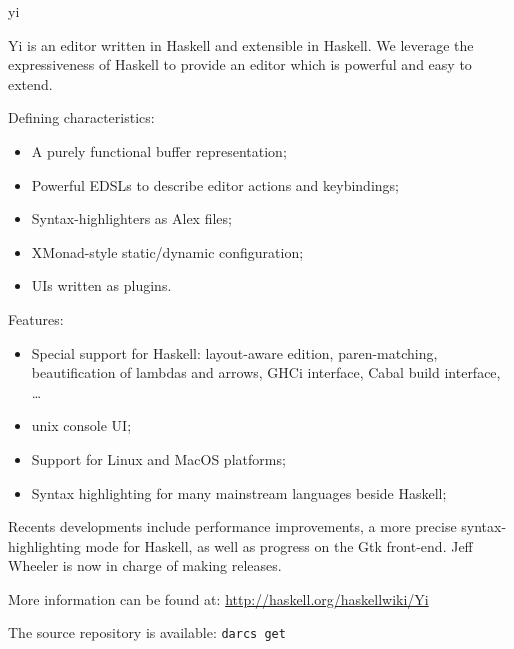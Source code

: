 \begin{hcarentry}[updated]{yi}
\label{yi}
\makeheader

Yi is an editor written in Haskell and extensible in Haskell. We leverage the
expressiveness of Haskell to provide an editor which is powerful and easy to
extend.

Defining characteristics:
\begin{itemize}
\item A purely functional buffer representation;
\item Powerful EDSLs to describe editor actions and keybindings;
\item Syntax-highlighters as Alex files;
\item XMonad-style static/dynamic configuration;
\item UIs written as plugins.
\end{itemize}

Features:
\begin{itemize}
\item Special support for Haskell: layout-aware edition, paren-matching, beautification of lambdas and arrows, GHCi interface, Cabal build interface, \dots
\item unix console UI;
\item Support for Linux and MacOS platforms;
\item Syntax highlighting for many mainstream languages beside Haskell;
\end{itemize}

Recents developments include performance improvements, a more precise
syntax-highlighting mode for Haskell, as well as progress on the Gtk
front-end. Jeff Wheeler is now in charge of making releases.

\FurtherReading
\begin{compactitem}
\item More information can be found at:
 \url{http://haskell.org/haskellwiki/Yi}

\item The source repository is available:
 \texttt{darcs get}
\end{compactitem}
\end{hcarentry}
